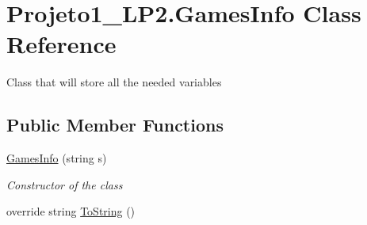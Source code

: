 \hypertarget{class_projeto1___l_p2_1_1_games_info}{}\section{Projeto1\+\_\+\+L\+P2.\+Games\+Info Class Reference}
\label{class_projeto1___l_p2_1_1_games_info}


Class that will store all the needed variables  


\subsection*{Public Member Functions}
\begin{DoxyCompactItemize}
\item 
\hyperlink{class_projeto1___l_p2_1_1_games_info_a4cb680651dead12ceef8359f79d8cdb0}{Games\+Info} (string s)
\begin{DoxyCompactList}\small\item\em Constructor of the class \end{DoxyCompactList}\item 
override string \hyperlink{class_projeto1___l_p2_1_1_games_info_a3d54b528793f1d664b441bdf61e756a3}{To\+String} ()
\end{DoxyCompactItemize}

